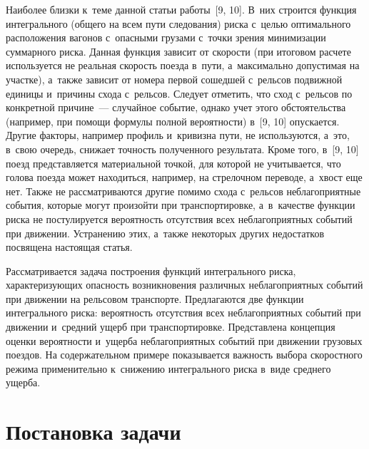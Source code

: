 \begin{multicols}{2}
Наиболее близ\-ки 
к~теме данной \mbox{статьи} работы~[9, 10]. В~них строится функция интегрального 
(общего на всем пути следования) риска с~\mbox{целью} оптимального расположения 
вагонов с~опасными грузами с~точ\-ки зрения минимизации суммарного рис\-ка. 
Данная функция зависит от ско\-рости (при итоговом расчете используется не 
реальная ско\-рость поезда в~пути, а~максимально допустимая на участ\-ке), а~также 
зависит от номера первой сошедшей с~рельсов по\-движ\-ной единицы и~причины 
схода с~рельсов. Следует отметить, что сход с~рельсов по конкретной причине~--- 
случайное событие, однако учет этого обстоятельства (например, при помощи 
формулы полной ве\-ро\-ят\-ности) в~[9, 10] опускается. Другие факторы, например 
профиль и~кривизна пути, не используются, а~это, в~свою очередь, снижает 
точ\-ность полученного результата. Кроме того, в~[9, 10] поезд пред\-став\-ля\-ет\-ся 
материальной точ\-кой, для которой не учитывается, что голова поезда может 
находиться, например, на стрелочном переводе, а~хвост еще нет. Также не 
рас\-смат\-ри\-ва\-ют\-ся другие помимо схода с~рельсов неблагоприятные события, 
которые могут произойти при транспортировке, а~в~качестве функции риска не 
по\-сту\-ли\-ру\-ет\-ся ве\-ро\-ят\-ность отсутствия всех неблагоприятных событий при 
движении. Устранению этих, а~так\-же некоторых других недостатков по\-свя\-ще\-на 
на\-сто\-ящая статья.

    Рассматривается задача построения функций интегрального риска, 
характеризующих опас\-ность возникновения различных неблагоприятных событий 
при движении на рельсовом транспорте. Предлагаются две функции 
интегрального риска: ве\-ро\-ят\-ность отсутствия всех неблагоприятных событий при 
движении и~сред\-ний ущерб при транспортировке. Пред\-став\-ле\-на концепция оценки 
ве\-ро\-ят\-ности и~ущерба неблагоприятных событий при движении грузовых поездов. 
На содержательном примере показывается важ\-ность выбора скоростного режима 
применительно к~снижению интегрального рис\-ка в~виде среднего ущерба.

\vspace*{-9pt}

\section{Постановка задачи}

\vspace*{-3pt}


\end{multicols}
